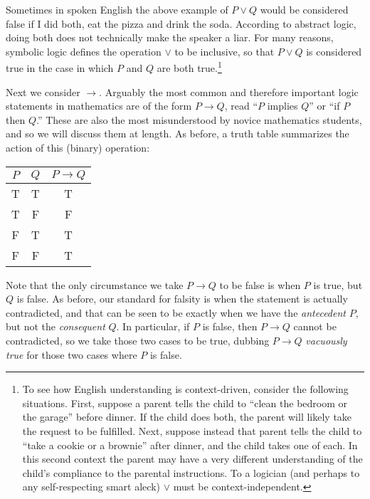 Sometimes in spoken English the above example of $P\vee Q$ would 
be considered false if I did both, eat the pizza and drink the soda.
According to abstract logic, doing
both does not technically make the speaker a liar.  For
many reasons, symbolic logic defines the operation
$\vee$ to be inclusive, so that  $P\vee Q$ is considered
true in  the  case in which  $P$ and $Q$ are both true.\footnote{%
To see how English understanding is context-driven,
consider the following situations.
First, suppose
a parent tells the child to ``clean the bedroom or the garage'' before
dinner.  If the child does both, the parent will likely take
the request to be fulfilled. Next, suppose instead
that parent tells the child to
``take a cookie or a brownie'' after dinner, 
and the child takes one of each.
In this second context
the parent may have a very different understanding of the child's
compliance to the parental instructions.
To a logician 
(and perhaps to any self-respecting smart aleck) 
$\vee$ must be context-independent.%
}


Next we consider $\longrightarrow$.
Arguably the most common and therefore important 
logic statements in mathematics 
are of the form $P\longrightarrow Q$,
read ``$P$ implies $Q$'' or  ``if $P$ then $Q$.''
These are also
the most misunderstood by novice mathematics students,
and so we will discuss them at length.
As before, a truth table summarizes the action of
this (binary) operation:

\begin{center}
\medskip

\begin{tabular}{|c|c||c|}\hline 
$P$ & $Q$& $P\longrightarrow Q$\\
\hline
T&T&T\\
T&F&F\\
F&T&T\\
F&F&T\\\hline\end{tabular} 

\medskip
\end{center}

\noindent
Note that the only circumstance we take $P\longrightarrow Q$ to be
false is when $P$ is true, but $Q$ is false.  As before, our
standard for falsity is when the statement is actually contradicted,
and that can be seen to be exactly when we have
the {\it antecedent} $P$, but not the {\it consequent} $Q$.
In particular, if $P$ is false, then $P\longrightarrow Q$ cannot
be contradicted, so we take those two cases to be true,
dubbing $P\longrightarrow Q$ {\it vacuously true} for those
two cases where $P$ is false.  

